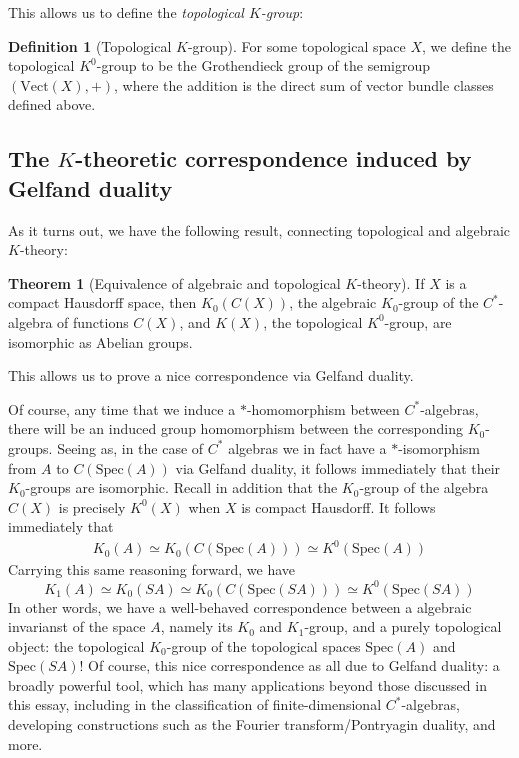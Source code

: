 \documentclass[aps,pra,showpacs,notitlepage,onecolumn,superscriptaddress,nofootinbib]{revtex4-1}
\theoremstyle{definition}
\newtheorem{definition}{Definition}[section]
\newtheorem{theorem}{Theorem}[section]
\begin{document}
\noindent This allows us to define the \emph{topological $K$-group}:

\begin{definition}[Topological $K$-group]
  For some topological space $X$, we define the topological $K^{0}$-group to be the Grothendieck group of the semigroup $(\text{Vect}(X), +)$, where the addition is the direct sum of vector bundle classes defined above.
  \end{definition}

\subsection{The $K$-theoretic correspondence induced by Gelfand duality}

\noindent As it turns out, we have the following result, connecting topological and algebraic $K$-theory:

\begin{theorem}[Equivalence of algebraic and topological $K$-theory]
If $X$ is a compact Hausdorff space, then $K_0(C(X))$, the algebraic $K_0$-group of the $C^{*}$-algebra of functions $C(X)$, and $K(X)$, the topological $K^{0}$-group, are isomorphic as Abelian groups.
\end{theorem}

\noindent This allows us to prove a nice correspondence via Gelfand duality.
\newline

\noindent Of course, any time that we induce a $*$-homomorphism between $C^{*}$-algebras, there will be an induced group homomorphism between the corresponding
$K_0$-groups. Seeing as, in the case of $C^{*}$ algebras we in fact have a $*$-isomorphism from $A$ to $C(\text{Spec}(A))$ via Gelfand duality, it follows immediately that their $K_0$-groups
are isomorphic. Recall in addition that the $K_0$-group of the algebra $C(X)$ is precisely $K^{0}(X)$ when $X$ is compact Hausdorff. It follows immediately that
\begin{align}
  K_0(A) \simeq K_0(C(\text{Spec}(A))) \simeq K^0(\text{Spec}(A))
\end{align}
Carrying this same reasoning forward, we have
\begin{equation}
  K_1(A) \simeq K_0(SA) \simeq  K_0(C(\text{Spec}(SA))) \simeq K^0(\text{Spec}(SA))
\end{equation}
In other words, we have a well-behaved correspondence between a algebraic invarianst of the space $A$, namely its $K_0$ and $K_1$-group, and
a purely topological object: the topological $K_0$-group of the topological spaces $\text{Spec}(A)$ and $\text{Spec}(SA)$! Of course,
this nice correspondence as all due to Gelfand duality: a broadly powerful tool, which has many applications beyond those discussed in this essay, including
in the classification of finite-dimensional $C^{*}$-algebras, developing constructions such as the Fourier transform/Pontryagin duality, and more.
\end{document}
